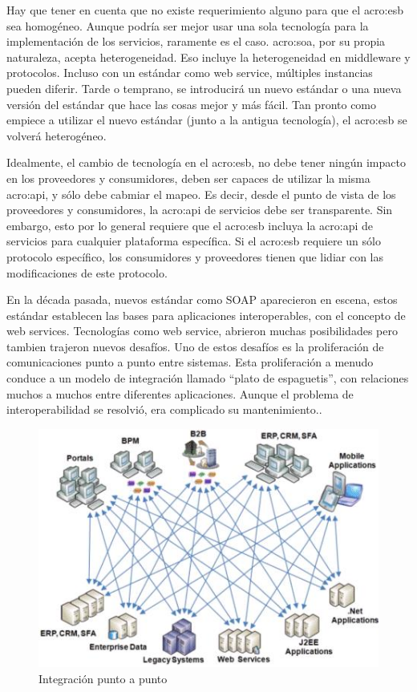 Hay que tener en cuenta que no existe requerimiento alguno para que el \gls{acro:esb} sea homogéneo.  Aunque podría ser mejor usar una sola tecnología para la implementación de los servicios, raramente es el caso. \gls{acro:soa}, por su propia naturaleza, acepta heterogeneidad. Eso incluye la heterogeneidad en middleware y protocolos. Incluso con un estándar como web service, múltiples instancias pueden diferir.  Tarde o temprano, se introducirá un nuevo estándar o una nueva versión del estándar que hace las cosas mejor y más fácil. Tan pronto como empiece a utilizar el nuevo estándar (junto a la antigua tecnología), el \gls{acro:esb} se volverá heterogéneo\cite[p.~49]{josuttis2007}.

Idealmente, el cambio de tecnología en el \gls{acro:esb}, no debe tener ningún impacto en los proveedores y consumidores, deben ser capaces de utilizar la misma \gls{acro:api}, y sólo debe cabmiar el mapeo.
Es decir, desde el punto de vista de los proveedores y consumidores, la \gls{acro:api} de servicios debe ser transparente. Sin embargo, esto por lo general requiere que el \gls{acro:esb} incluya la \gls{acro:api} de servicios para cualquier plataforma específica. Si el \gls{acro:esb} requiere un sólo protocolo específico, los consumidores y proveedores tienen que lidiar con las modificaciones de este protocolo\cite[p.~50]{josuttis2007}.


En la década pasada, nuevos estándar como SOAP aparecieron en escena, estos estándar establecen las bases para aplicaciones interoperables, con el concepto de web services.
Tecnologías como web service, abrieron muchas posibilidades pero tambien trajeron nuevos desafíos.  Uno de estos desafíos es la proliferación de comunicaciones punto a punto entre sistemas.  Esta proliferación a menudo conduce a un modelo de integración llamado ``plato de espaguetis'', con relaciones muchos a muchos entre diferentes aplicaciones.
Aunque el problema de interoperabilidad se resolvió, era complicado su mantenimiento.\cite[p.~4]{dossotandemic2010}.

\begin{figure}[H]
  \includegraphics[width=\linewidth]{src/images/03-capitulo-3/tecnologias/esb/point-to-point-integration.png}
  \caption{Integración punto a punto}
  \label{fig:point-to-point-integration}
\end{figure}


